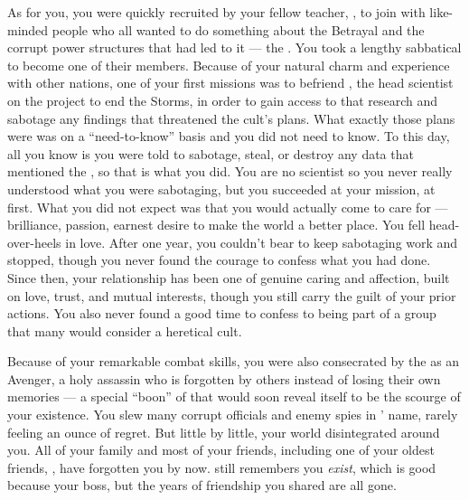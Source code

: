 \documentclass[char]{GL2020}
\begin{document}
As for you, you were quickly recruited by your fellow teacher, \cChupSecond{\full}, to join with like-minded people who all wanted to do something about the Betrayal and the corrupt power structures that had led to it — the \pGoaties{}. You took a lengthy sabbatical to become one of their members. Because of your natural charm and experience with other nations, one of your first missions was to befriend \cHeadScientist{\full}, the head scientist on the project to end the Storms, in order to gain access to that research and sabotage any findings that threatened the cult’s plans. What exactly those plans were was on a “need-to-know” basis and you did not need to know. To this day, all you know is you were told to sabotage, steal, or destroy any data that mentioned the \pSchool{}, so that is what you did. You are no scientist so you never really understood what you were sabotaging, but you succeeded at your mission, at first. What you did not expect was that you would actually come to care for \cHeadScientist{} — \cHeadScientist{\their} brilliance, \cHeadScientist{\their} passion, \cHeadScientist{\their} earnest desire to make the world a better place. You fell head-over-heels in love. After one year, you couldn't bear to keep sabotaging \cHeadScientist{\their} work and stopped, though you never found the courage to confess what you had done. Since then, your relationship has been one of genuine caring and affection, built on love, trust, and mutual interests, though you still carry the guilt of your prior actions. You also never found a good time to confess to being part of a group that many would consider a heretical cult.

Because of your remarkable combat skills, you were also consecrated by the \pGoaties{} as an Avenger, a holy assassin who is forgotten by others instead of losing their own memories — a special ``boon'' of \cGenesis{} that would soon reveal itself to be the scourge of your existence. You slew many corrupt officials and enemy spies in \cGenesis{}’ name, rarely feeling an ounce of regret. But little by little, your world disintegrated around you. All of your family and most of your friends, including one of your oldest friends, \cPrincipal{}, have forgotten you by now. \cPrincipal{} still remembers you \emph{exist}, which is good because \cPrincipal{\they} \cPrincipal{\are} your boss, but the years of friendship you shared are all gone. 
\end{document}
